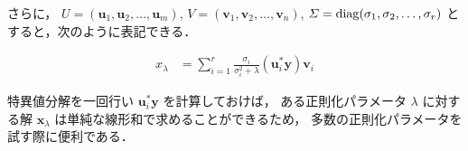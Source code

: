 さらに，
$U = (\bm{u}_1, \bm{u}_2, \ldots, \bm{u}_m)$,
$V = (\bm{v}_1, \bm{v}_2, \ldots, \bm{v}_n)$,
$\varSigma = \operatorname{diag}(\sigma_1, \sigma_2, \ldots, \sigma_r)$
とすると，次のように表記できる．

\begin{align}
    x_{\lambda}
     & = \sum_{i = 1}^{r} \frac{\sigma_i}{\sigma_i^2 + \lambda} (\bm{u}_i^* \bm{y}) \bm{v}_i
\end{align}

特異値分解を一回行い
$\bm{u}_i^* \bm{y}$
を計算しておけば，
ある正則化パラメータ $\lambda$ に対する解 $\bm{x}_{\lambda}$ は単純な線形和で求めることができるため，
多数の正則化パラメータを試す際に便利である．
